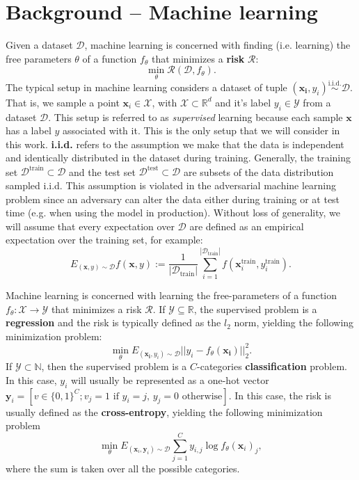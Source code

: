 \section{Background -- Machine learning}
\label{sec-background}
Given a dataset $\mathcal{D}$, machine learning is concerned with finding (i.e. learning) the free parameters $\theta$ of a function $f_\theta$ that minimizes a \textbf{risk} $\mathcal{R}$:
\[
\min_\theta \mathcal{R}(\mathcal{D}, f_\theta).
\]
The typical setup in machine learning considers a dataset of tuple $(\bm{x_i}, y_i)\stackrel{\text{i.i.d.}}{\sim} \mathcal{D}$.
That is, we sample a point $\bm x_i\in\mathcal{X}$, with $\mathcal{X}\subset\mathbb{R}^d$ and it's label $y_i\in\mathcal{Y}$ from a dataset $\mathcal{D}$.
This setup is referred to as \textit{supervised} learning because each sample $\bm x$ has a label $y$ associated with it. This is the only setup that we will consider in this work.
\textbf{i.i.d.} refers to the assumption we make that the data is independent and identically distributed in the dataset during training.
Generally, the training set $\mathcal{D}^\text{train}\subset\mathcal{D}$ and the test set $\mathcal{D}^\text{test}\subset\mathcal{D}$ are subsets of the data distribution sampled i.i.d.
This assumption is violated in the adversarial machine learning problem since an adversary can alter the data either during training or at test time (e.g. when using the model in production).
Without loss of generality, we will assume that every expectation over $\mathcal{D}$ are defined as an empirical expectation over the training set, for example:
\[
    E_{(\bm x, y)\sim\mathcal{D}}f(\bm x, y) := \dfrac{1}{|\mathcal{D}_\text{train}|}\sum_{i=1}^{|\mathcal{D}_\text{train}|}f(\bm x_i^{\text{train}}, y_i^{\text{train}}).
\]

Machine learning is concerned with learning the free-parameters of a function $f_\theta:\mathcal X\to \mathcal Y$ that minimizes a risk $\mathcal{R}$. If $\mathcal{Y}\subseteq\mathbb{R}$, the supervised problem is a \textbf{regression} and the risk is typically defined as the $l_2$ norm, yielding the following minimization problem:
\[
\min_\theta E_{(\bm{x_i}, y_i)\sim\mathcal{D}}||y_i - f_\theta(\bm{x_i})||^2_2.
\]
If $\mathcal Y\subset\mathbb{N}$, then the supervised problem is a $C$-categories \textbf{classification} problem. In this case, $y_i$ will usually be represented as a one-hot vector $\bm y_i=[v\in\{0, 1\}^{C}; v_j=1\text{ if } y_i=j\text{, } y_j=0\text{ otherwise}]$. In this case, the risk is usually defined as the \textbf{cross-entropy}, yielding the following minimization problem
\[
\min_\theta E_{(\bm x_i, \bm y_i)\sim\mathcal{D}}\sum_{j=1}^C y_{i,j}\log f_\theta(\bm x_i)_j,
\]
where the sum is taken over all the possible categories.


